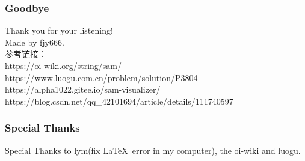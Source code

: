 \documentclass{beamer}
\begin{document}
    \begin{frame}
        \frametitle{Goodbye}
        Thank you for your listening!\\
        Made by fjy666.\\
        参考链接：\\
        https://oi-wiki.org/string/sam/ \\
        https://www.luogu.com.cn/problem/solution/P3804 \\
        https://alpha1022.gitee.io/sam-visualizer/ \\
        https://blog.csdn.net/qq\_42101694/article/details/111740597
    \end{frame}

    \begin{frame}
        \frametitle{Special Thanks}
        Special Thanks to lym(fix \LaTeX\ error in my computer), the oi-wiki and luogu.
    \end{frame}
\end{document}
